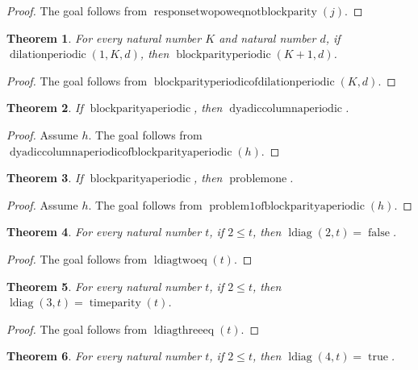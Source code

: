 \documentclass[11pt]{article}
\newtheorem{theorem}{Theorem}[section]
\theoremstyle{definition}
\begin{document}
\begin{proof}
The goal follows from \(\operatorname{responsetwopoweqnotblockparity}(j)\).
\end{proof}
\begin{theorem}
\label{ll:observations:block-parity-periodic-of-dilation-periodic}
For every natural number \(K\) and natural number \(d\), if \(\operatorname{dilationperiodic}(1, K, d)\), then \(\operatorname{blockparityperiodic}(K + 1, d)\).
\end{theorem}
\begin{proof}
The goal follows from \(\operatorname{blockparityperiodicofdilationperiodic}(K, d)\).
\end{proof}
\begin{theorem}
\label{ll:observations:dyadic-column-aperiodic-of-block-parity-aperiodic}
If \(\operatorname{blockparityaperiodic}\), then \(\operatorname{dyadiccolumnaperiodic}\).
\end{theorem}
\begin{proof}
Assume \(h\).
The goal follows from \(\operatorname{dyadiccolumnaperiodicofblockparityaperiodic}(h)\).
\end{proof}
\begin{theorem}
\label{ll:observations:problem1-of-block-parity-aperiodic}
If \(\operatorname{blockparityaperiodic}\), then \(\operatorname{problemone}\).
\end{theorem}
\begin{proof}
Assume \(h\).
The goal follows from \(\operatorname{problem1ofblockparityaperiodic}(h)\).
\end{proof}
\begin{theorem}
\label{ll:observations:ldiag-two-eq}
For every natural number \(t\), if \(2 \le t\), then \(\operatorname{ldiag}(2, t) = \operatorname{false}\).
\end{theorem}
\begin{proof}
The goal follows from \(\operatorname{ldiagtwoeq}(t)\).
\end{proof}
\begin{theorem}
\label{ll:observations:ldiag-three-eq}
For every natural number \(t\), if \(2 \le t\), then \(\operatorname{ldiag}(3, t) = \operatorname{timeparity}(t)\).
\end{theorem}
\begin{proof}
The goal follows from \(\operatorname{ldiagthreeeq}(t)\).
\end{proof}
\begin{theorem}
\label{ll:observations:ldiag-four-eq}
For every natural number \(t\), if \(2 \le t\), then \(\operatorname{ldiag}(4, t) = \operatorname{true}\).
\end{theorem}
\end{document}

